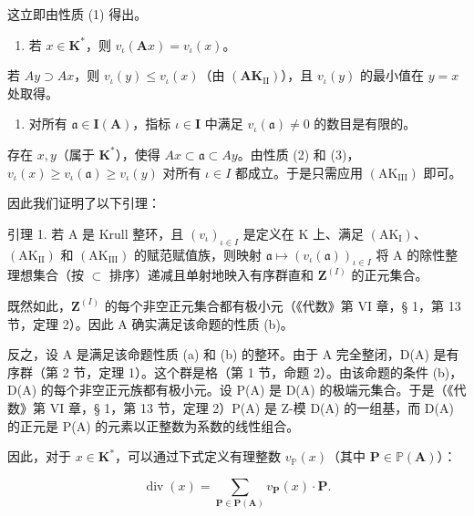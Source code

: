 这立即由性质 (1) 得出。

\begin{enumerate}
\def\labelenumi{(\arabic{enumi})}
\setcounter{enumi}{2}
\tightlist
\item
  若 \(x \in \mathbf{K}^*\)，则 \(v_{\iota}(\mathbf{A}x) = v_{\iota}(x)\)。
\end{enumerate}

若 \(A y \supset A x\)，则 \(v_{\iota}(y) \leqslant v_{\iota}(x)\)（由 \((\mathbf{A K}_{\mathrm{II}})\)），且 \(v_{\iota}(y)\) 的最小值在 \(y = x\) 处取得。

\begin{enumerate}
\def\labelenumi{(\arabic{enumi})}
\setcounter{enumi}{3}
\tightlist
\item
  对所有 \(\mathfrak{a} \in \mathbf{I}(\mathbf{A})\)，指标 \(\iota \in \mathbf{I}\) 中满足 \(v_{\iota}(\mathfrak{a}) \neq 0\) 的数目是有限的。
\end{enumerate}

存在 \(x, y\)（属于 \(\mathbf{K}^*\)），使得 \(Ax \subset \mathfrak{a} \subset Ay\)。由性质 (2) 和 (3)，\(v_{\iota}(x) \geqslant v_{\iota}(\mathfrak{a}) \geqslant v_{\iota}(y)\) 对所有 \(\iota \in I\) 都成立。于是只需应用 \((\mathrm{AK}_{\mathrm{III}})\) 即可。

因此我们证明了以下引理：

引理 1. 若 A 是 Krull 整环，且 \((v_{\iota})_{\iota \in I}\) 是定义在 K 上、满足 \((\mathrm{AK}_{\mathrm{I}})\)、\((\mathrm{AK}_{\mathrm{II}})\) 和 \((\mathrm{AK}_{\mathrm{III}})\) 的赋范赋值族，则映射 \(\mathfrak{a} \mapsto (v_{\iota}(\mathfrak{a}))_{\iota \in I}\) 将 A 的除性整理想集合（按 \(\subset\) 排序）递减且单射地映入有序群直和 \(\mathbf{Z}^{(I)}\) 的正元集合。

既然如此，\(\mathbf{Z}^{(I)}\) 的每个非空正元集合都有极小元（《代数》第 VI 章，§ 1，第 13 节，定理 2）。因此 A 确实满足该命题的性质 (b)。

反之，设 A 是满足该命题性质 (a) 和 (b) 的整环。由于 A 完全整闭，D(A) 是有序群（第 2 节，定理 1）。这个群是格（第 1 节，命题 2）。由该命题的条件 (b)，D(A) 的每个非空正元族都有极小元。设 P(A) 是 D(A) 的极端元集合。于是（《代数》第 VI 章，§ 1，第 13 节，定理 2）P(A) 是 Z-模 D(A) 的一组基，而 D(A) 的正元是 P(A) 的元素以正整数为系数的线性组合。
 
因此，对于 \(x \in \mathbf{K}^*\)，可以通过下式定义有理整数 \(v_{\mathbb{P}}(x)\)（其中 \(\mathbf{P} \in \mathbb{P}(\mathbf{A})\)）：

\[
\operatorname{div} (x) = \sum_ {\mathbf {P} \in \mathbf {P} (\mathbf {A})} v _ {\mathbf {P}} (x) \cdot \mathbf {P}.\tag{4}
\]

